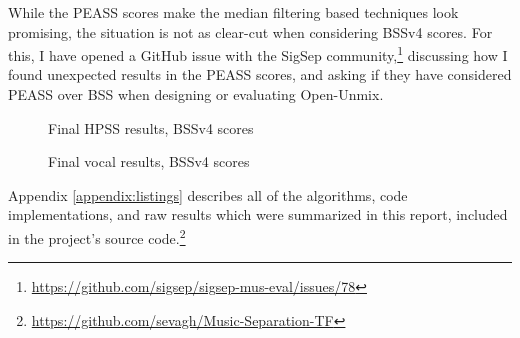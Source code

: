 \documentclass[letter,12pt]{article}
\begin{document}
While the PEASS scores make the median filtering based techniques look promising, the situation is not as clear-cut when considering BSSv4 scores. For this, I have opened a GitHub issue with the SigSep community,\footnote{\url{https://github.com/sigsep/sigsep-mus-eval/issues/78}} discussing how I found unexpected results in the PEASS scores, and asking if they have considered PEASS over BSS when designing or evaluating Open-Unmix.

\begin{figure}[ht]
	\centering
	\caption{Final HPSS results, BSSv4 scores}
	\label{fig:bssv4hpss}
	\vspace{1em}
	\caption{Final vocal results, BSSv4 scores}
	\label{fig:bssv4vocal}
\end{figure}

Appendix \ref{appendix:listings} describes all of the algorithms, code implementations, and raw results which were summarized in this report, included in the project's source code.\footnote{\url{https://github.com/sevagh/Music-Separation-TF}}
\end{document}
